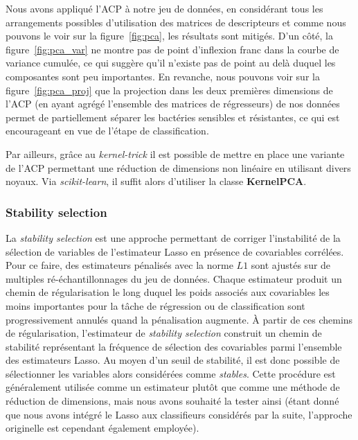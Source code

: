\documentclass[11pt]{article}
\begin{document}
  Nous avons appliqué l'ACP à notre jeu de données, en considérant tous les arrangements possibles d'utilisation des matrices de descripteurs et comme nous pouvons le voir sur la figure~\ref{fig:pca}, les résultats sont mitigés.
  D'un côté, la figure~\ref{fig:pca_var} ne montre pas de point d'inflexion franc dans la courbe de variance cumulée, ce qui suggère qu'il n'existe pas de point au delà duquel les composantes sont peu importantes.
  En revanche, nous pouvons voir sur la figure~\ref{fig:pca_proj} que la projection dans les deux premières dimensions de l'ACP (en ayant agrégé l'ensemble des matrices de régresseurs) de nos données permet de partiellement séparer les bactéries sensibles et résistantes, ce qui est encourageant en vue de l'étape de classification.

  Par ailleurs, grâce au \textit{kernel-trick} il est possible de mettre en place une variante de l'ACP permettant une réduction de dimensions non linéaire en utilisant divers noyaux.
  Via \textit{scikit-learn}, il suffit alors d'utiliser la classe \textbf{KernelPCA}.

\hypertarget{stability-selection}{%
\subsubsection{Stability selection}\label{stability-selection}}

  La \textit{stability selection} est une approche permettant de corriger l'instabilité de la sélection de variables de l'estimateur Lasso en présence de covariables corrélées.
  Pour ce faire, des estimateurs pénalisés avec la norme $L1$ sont ajustés sur de multiples ré-échantillonnages du jeu de données.
  Chaque estimateur produit un chemin de régularisation le long duquel les poids associés aux covariables les moins importantes pour la tâche de régression ou de classification sont progressivement annulés quand la pénalisation augmente.
  À partir de ces chemins de régularisation, l'estimateur de \textit{stability selection} construit un chemin de stabilité représentant la fréquence de sélection des covariables parmi l'ensemble des estimateurs Lasso.
  Au moyen d'un seuil de stabilité, il est donc possible de sélectionner les variables alors considérées comme \textit{stables}.
  Cette procédure est généralement utilisée comme un estimateur plutôt que comme une méthode de réduction de dimensions, mais nous avons souhaité la tester ainsi (étant donné que nous avons intégré le Lasso aux classifieurs considérés par la suite, l'approche originelle est cependant également employée).
\end{document}
